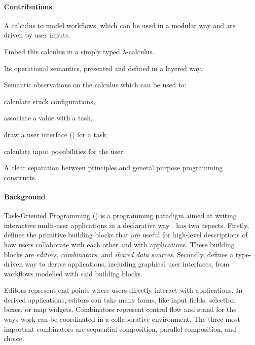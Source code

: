 \paragraph{Contributions}
\begin{itemize*}
  \item A calculus to model workflows, which can be used in a modular way and are driven by user inputs.
  \item Embed this calculus in a simply typed $\lambda$-calculus.
  \item Its operational semantics, presented and defined in a layered way.
  \item Semantic observations on the calculus which can be used to:
  \begin{itemize*}
    \item calculate stuck configurations,
    \item associate a value with a task,
    \item draw a user interface (\UI) for a task,
    \item calculate input possibilities for the user.
  \end{itemize*}
  \item A clear separation between \TOP principles and general purpose programming constructs.
\end{itemize*}


\paragraph{Background}
Task-Oriented Programming (\TOP) is a programming paradigm aimed at writing interactive multi-user applications in a declarative way \cite{conf/ppdp/PlasmeijerLMAK12}.
\TOP has two aspects.
Firstly, \TOP defines the primitive building blocks that are useful for high-level descriptions of how users collaborate with each other and with applications.
These building blocks are \emph{editors}, \emph{combinators}, and \emph{shared data sources}.
Secondly, \TOP defines a type-driven way to derive applications, including graphical user interfaces, from workflows modelled with said building blocks.

Editors represent end points where users directly interact with applications.
In derived applications, editors can take many forms, like input fields, selection boxes, or map widgets.
Combinators represent control flow and stand for the ways work can be coordinated in a collaborative environment.
The three most important combinators are sequential composition, parallel composition, and choice.

